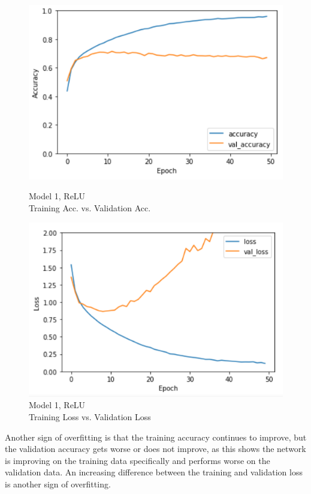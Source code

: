 \documentclass[a4paper, 11pt]{article}
\begin{document}
\begin{figure}[h]
\begin{minipage}{0.45\textwidth}
\captionsetup{justification=centering}
\centering
\includegraphics[scale=0.45]{1overfita}
\caption[caption]{Model 1, ReLU \\ Training Acc. vs. Validation Acc.}
\label{m1oa} %
\end{minipage}
\begin{minipage}{0.45\textwidth}
\captionsetup{justification=centering}
\centering
\includegraphics[scale=0.45]{1overfitl}
\caption{Model 1, ReLU\\ Training Loss vs. Validation Loss}
\label{m1ol}%
\end{minipage}
\end{figure}

Another sign of overfitting is that the training accuracy continues to improve, but the validation accuracy gets worse or does not improve, as this shows the network is improving on the training data specifically and performs worse on the validation data. An increasing difference between the training and validation loss is another sign of overfitting. 
\end{document}
